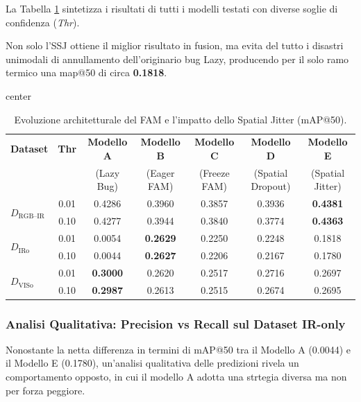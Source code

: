 \documentclass[a4paper,11pt]{article}
\begin{document}
La Tabella \ref{tab:rtdetr_fam_archit} sintetizza i risultati di tutti i modelli testati 
con diverse soglie di confidenza (\textit{Thr}). 

Non solo l'SSJ ottiene il miglior risultato in fusion, ma evita del tutto i disastri 
unimodali di annullamento dell'originario bug Lazy, producendo per il solo ramo termico 
una map@50 di circa \textbf{0.1818}.

\begin{table}[h]
\centering
\caption{Evoluzione architetturale del FAM e l'impatto dello Spatial Jitter (mAP@50).}
\label{tab:rtdetr_fam_archit}
\begin{adjustbox}{center}
\begin{tabular}{lc|ccccc}
\toprule
\textbf{Dataset} & \textbf{Thr} & \textbf{Modello A} & \textbf{Modello B} & 
\textbf{Modello C} & \textbf{Modello D} & \textbf{Modello E} \\
& & (Lazy Bug) & (Eager FAM) & (Freeze FAM) & (Spatial Dropout) & (Spatial Jitter) \\
\midrule
\multirow{2}{*}{$D_{\text{RGB--IR}}$} & 0.01 & 0.4286 & 0.3960 & 0.3857 & 0.3936 & \textbf{0.4381} \\
                                       & 0.10 & 0.4277 & 0.3944 & 0.3840 & 0.3774 & \textbf{0.4363} \\
\midrule
\multirow{2}{*}{$D_{\text{IRo}}$}     & 0.01 & 0.0054 & \textbf{0.2629} & 0.2250 & 0.2248 & 0.1818 \\
                                       & 0.10 & 0.0044 & \textbf{0.2627} & 0.2206 & 0.2167 & 0.1780 \\
\midrule
\multirow{2}{*}{$D_{\text{VISo}}$}    & 0.01 & \textbf{0.3000} & 0.2620 & 0.2517 & 0.2716 & 0.2697 \\
                                       & 0.10 & \textbf{0.2987} & 0.2613 & 0.2515 & 0.2674 & 0.2695 \\
\bottomrule
\end{tabular}
\end{adjustbox}
\end{table}

\newpage

\subsubsection*{Analisi Qualitativa: Precision vs Recall sul Dataset IR-only}

Nonostante la netta differenza in termini di mAP@50 tra il Modello A (0.0044) e il Modello E (0.1780), un'analisi qualitativa delle predizioni rivela un comportamento opposto, in cui il modello A adotta una strtegia diversa ma non per forza peggiore.
\end{document}
